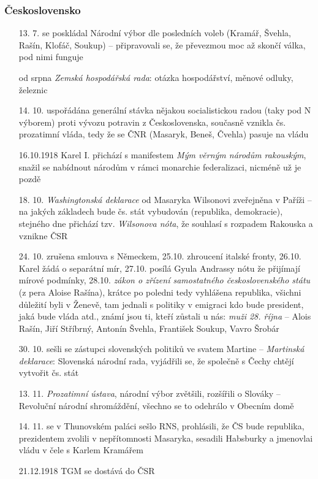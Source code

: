 \documentclass{article}
\begin{document}
\subsubsection*{Československo}
\begin{itemize}
  \item[13. 7.] se poskládal Národní výbor dle posledních voleb (Kramář, Švehla, Rašín, Klofáč, Soukup) -- připravovali se, že převezmou moc až skončí válka, pod nimi funguje
  \item[od srpna] \textit{Zemská hospodářská rada}: otázka hospodářství, měnové odluky, železnic
  \item[14. 10.] uspořádána generální stávka nějakou socialistickou radou (taky pod N výborem) proti vývozu potravin z Československa, současně vznikla čs. prozatimní vláda, tedy že se ČNR (Masaryk, Beneš, Čvehla) pasuje na vládu
  \item[16.10.1918] Karel I. přichází s manifestem \textit{Mým věrným národům rakouským}, snažil se nabídnout národům v rámci monarchie federalizaci, nicméně už je pozdě
  \item[18. 10.] \textit{Washingtonská deklarace} od Masaryka Wilsonovi zveřejněna v Paříži -- na jakých základech bude čs. stát vybudován (republika, demokracie), stejného dne přichází tzv. \textit{Wilsonova nóta}, že souhlasí s rozpadem Rakouska a vznikne ČSR
  \item[24. 10.] zrušena smlouva s Německem, 25.10. zhroucení italské fronty, 26.10. Karel žádá o separátní mír, 27.10. posílá Gyula Andrassy nótu že přijímají mírové podmínky, 28.10. \textit{zákon o zřízení samostatného čes\-ko\-slo\-ven\-ské\-ho státu} (z pera Aloise Rašína), krátce po poledni tedy vyhlášena republika, všichni důležití byli v Ženevě, tam jednali s politiky v emigraci kdo bude president, jaká bude vláda atd., známí jsou ti, kteří zůstali u nás: \textit{muži 28. října} -- Alois Rašín, Jiří Stříbrný, Antonín Švehla, František Soukup, Vavro Šrobár
  \item[30. 10.] sešli se zástupci slovenských politiků ve svatem Martine -- \textit{Martinská deklarace}: Slovenská národní rada, vyjádřili se, že společně s Čechy chtějí vytvořit čs. stát
  \item[13. 11.] \textit{Prozatimní ústava}, národní výbor zvětšili, rozšířili o Slováky -- Revoluční národní shromáždění, všechno se to odehrálo v Obecním domě
  \item[14. 11.] se v Thunovském paláci sešlo RNS, prohlásili, že ČS bude republika, prezidentem zvolili v nepřítomnosti Masaryka, sesadili Habsburky a jmenovlai vládu v čele s Karlem Kramářem
  \item[21.12.1918] TGM se dostává do ČSR
\end{itemize}
\end{document}
